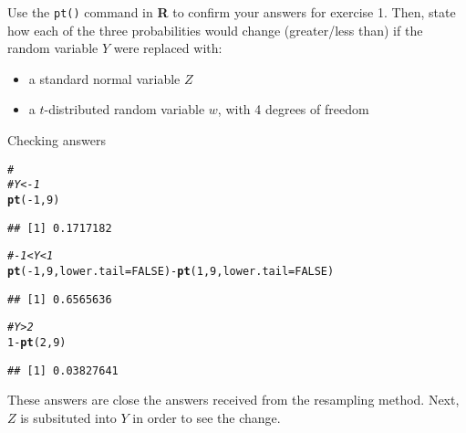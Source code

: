 \documentclass[12pt]{article}\usepackage[]{graphicx}\usepackage[]{color}
\makeatletter
\newcommand{\hlnum}[1]{\textcolor[rgb]{0.686,0.059,0.569}{#1}}%
\newcommand{\hlcom}[1]{\textcolor[rgb]{0.678,0.584,0.686}{\textit{#1}}}%
\newcommand{\hlopt}[1]{\textcolor[rgb]{0,0,0}{#1}}%
\newcommand{\hlstd}[1]{\textcolor[rgb]{0.345,0.345,0.345}{#1}}%
\newcommand{\hlkwc}[1]{\textcolor[rgb]{0.333,0.667,0.333}{#1}}%
\newcommand{\hlkwd}[1]{\textcolor[rgb]{0.737,0.353,0.396}{\textbf{#1}}}%
\newenvironment{kframe}{%
 \def\at@end@of@kframe{}%
 \ifinner\ifhmode%
  \def\at@end@of@kframe{\end{minipage}}%
  \begin{minipage}{\columnwidth}%
 \fi\fi%
 \def\FrameCommand##1{\hskip\@totalleftmargin \hskip-\fboxsep
 \colorbox{shadecolor}{##1}\hskip-\fboxsep
     \hskip-\linewidth \hskip-\@totalleftmargin \hskip\columnwidth}%
 \MakeFramed {\advance\hsize-\width
   \@totalleftmargin\z@ \linewidth\hsize
   \@setminipage}}%
 {\par\unskip\endMakeFramed%
 \at@end@of@kframe}
\newenvironment{knitrout}{}{} %
\newenvironment{exercise}[2][Exercise]{\begin{trivlist}
\item[\hskip \labelsep {\bfseries #1}\hskip \labelsep {\bfseries #2.}]}{\end{trivlist}}
\newenvironment{Answer}[2][Answer]{\begin{trivlist}
\item[\hskip \labelsep {\bfseries #1}\hskip \labelsep {\bfseries #2.}]}{\end{trivlist}}
\makeatother
\begin{document}
\begin{exercise}{2}
Use the \texttt{pt()} command in \textbf{R} to confirm your answers for exercise 1. Then, state how each of the three probabilities would change (greater/less than) if the random variable $Y$ were replaced with:
\begin{itemize}
  \item a standard normal variable $Z$
  \item a $t$-distributed random variable $w$, with 4 degrees of freedom
\end{itemize}
\end{exercise}

\begin{Answer}{2} 

Checking answers
\begin{knitrout}
\color{fgcolor}\begin{kframe}
\begin{alltt}
\hlcom{# }
\hlcom{# Y < -1}
\hlkwd{pt}\hlstd{(}\hlopt{-}\hlnum{1}\hlstd{,}\hlnum{9}\hlstd{)}
\end{alltt}
\begin{verbatim}
## [1] 0.1717182
\end{verbatim}
\begin{alltt}
\hlcom{# -1 < Y < 1}
\hlkwd{pt}\hlstd{(}\hlopt{-}\hlnum{1}\hlstd{,}\hlnum{9}\hlstd{,}\hlkwc{lower.tail}\hlstd{=}\hlnum{FALSE}\hlstd{)}\hlopt{-}\hlkwd{pt}\hlstd{(}\hlnum{1}\hlstd{,}\hlnum{9}\hlstd{,}\hlkwc{lower.tail}\hlstd{=}\hlnum{FALSE}\hlstd{)}
\end{alltt}
\begin{verbatim}
## [1] 0.6565636
\end{verbatim}
\begin{alltt}
\hlcom{# Y > 2}
\hlnum{1}\hlopt{-}\hlkwd{pt}\hlstd{(}\hlnum{2}\hlstd{,}\hlnum{9}\hlstd{)}
\end{alltt}
\begin{verbatim}
## [1] 0.03827641
\end{verbatim}
\end{kframe}
\end{knitrout}
These answers are close the answers received from the resampling method. Next, $Z$ is subsituted into $Y$ in order to see the change.


\end{Answer}
\end{document}
